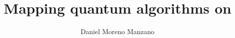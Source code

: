 \documentclass{tudelft-report}
\begin{document}
\abovedisplayskip=4pt
\abovedisplayshortskip=4pt
\belowdisplayskip=4pt
\belowdisplayshortskip=4pt

\frontmatter

\title[superconducting \\ quantum processors]{Mapping quantum algorithms on}
\author{Daniel Moreno Manzano}


\begingroup
{}
\makecover
\endgroup











\tableofcontents

\mainmatter

%

\appendix


%


\end{document}
